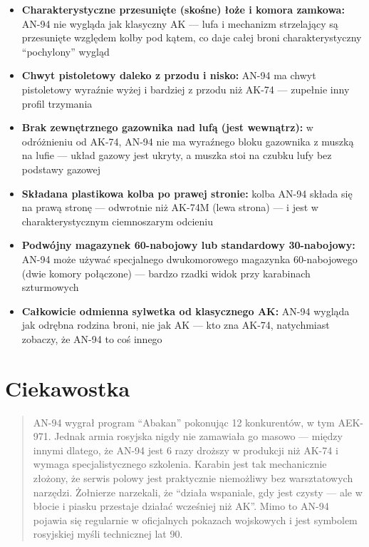 \documentclass[12pt,openany,oneside]{book}
\providecommand{\tightlist}{%
  \setlength{\itemsep}{0pt}\setlength{\parskip}{0pt}}
\begin{document}
\begin{itemize}
\tightlist
\item
  \textbf{Charakterystyczne przesunięte (skośne) łoże i komora zamkowa:}
  AN-94 nie wygląda jak klasyczny AK --- lufa i mechanizm strzelający są
  przesunięte względem kolby pod kątem, co daje całej broni
  charakterystyczny ``pochylony'' wygląd
\item
  \textbf{Chwyt pistoletowy daleko z przodu i nisko:} AN-94 ma chwyt
  pistoletowy wyraźnie wyżej i bardziej z przodu niż AK-74 --- zupełnie
  inny profil trzymania
\item
  \textbf{Brak zewnętrznego gazownika nad lufą (jest wewnątrz):} w
  odróżnieniu od AK-74, AN-94 nie ma wyraźnego bloku gazownika z muszką
  na lufie --- układ gazowy jest ukryty, a muszka stoi na czubku lufy
  bez podstawy gazowej
\item
  \textbf{Składana plastikowa kolba po prawej stronie:} kolba AN-94
  składa się na prawą stronę --- odwrotnie niż AK-74M (lewa strona) ---
  i jest w charakterystycznym ciemnoszarym odcieniu
\item
  \textbf{Podwójny magazynek 60-nabojowy lub standardowy 30-nabojowy:}
  AN-94 może używać specjalnego dwukomorowego magazynka 60-nabojowego
  (dwie komory połączone) --- bardzo rzadki widok przy karabinach
  szturmowych
\item
  \textbf{Całkowicie odmienna sylwetka od klasycznego AK:} AN-94 wygląda
  jak odrębna rodzina broni, nie jak AK --- kto zna AK-74, natychmiast
  zobaczy, że AN-94 to coś innego
\end{itemize}

\section{Ciekawostka}\label{ciekawostka-50}

\begin{quote}
AN-94 wygrał program ``Abakan'' pokonując 12 konkurentów, w tym AEK-971.
Jednak armia rosyjska nigdy nie zamawiała go masowo --- między innymi
dlatego, że AN-94 jest 6 razy droższy w produkcji niż AK-74 i wymaga
specjalistycznego szkolenia. Karabin jest tak mechanicznie złożony, że
serwis polowy jest praktycznie niemożliwy bez warsztatowych narzędzi.
Żołnierze narzekali, że ``działa wspaniale, gdy jest czysty --- ale w
błocie i piasku przestaje działać wcześniej niż AK''. Mimo to AN-94
pojawia się regularnie w oficjalnych pokazach wojskowych i jest symbolem
rosyjskiej myśli technicznej lat 90.
\end{quote}
\end{document}
